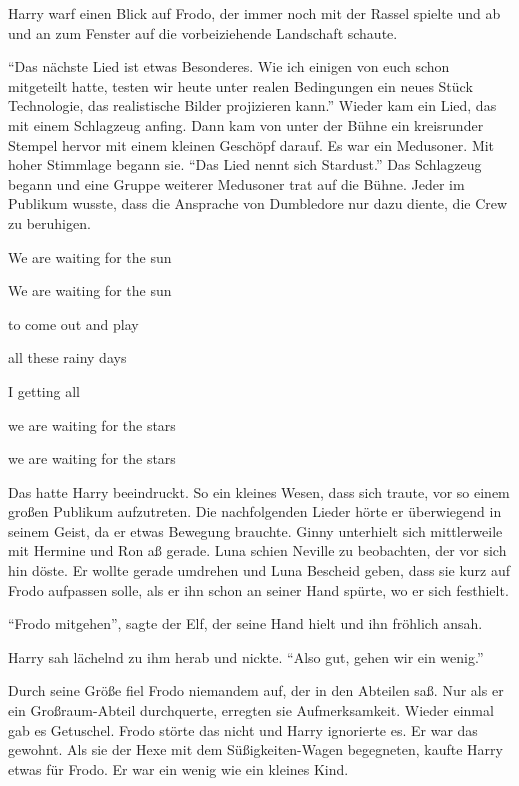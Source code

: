 Harry warf einen Blick auf Frodo, der immer noch mit der Rassel spielte und ab und an zum Fenster auf die vorbeiziehende Landschaft schaute.

\begin{rueckblick}
\enquote{Das nächste Lied ist etwas Besonderes. Wie ich einigen von euch schon mitgeteilt hatte, testen wir heute unter realen Bedingungen ein neues Stück Technologie, das realistische Bilder projizieren kann.} Wieder kam ein Lied, das mit einem Schlagzeug anfing. Dann kam von unter der Bühne ein kreisrunder Stempel hervor mit einem kleinen Geschöpf darauf. Es war ein Medusoner. Mit hoher Stimmlage begann sie. \enquote{Das Lied nennt sich Stardust.} Das Schlagzeug begann und eine Gruppe weiterer Medusoner trat auf die Bühne. Jeder im Publikum wusste, dass die Ansprache von Dumbledore nur dazu diente, die Crew zu beruhigen.

\begin{lied}
We are waiting for the sun

We are waiting for the sun

to come out and play

all these rainy days

I getting all

we are waiting for the stars

we are waiting for the stars\abs
\end{lied}
\end{rueckblick}

Das hatte Harry beeindruckt. So ein kleines Wesen, dass sich traute, vor so einem großen Publikum aufzutreten. Die nachfolgenden Lieder hörte er überwiegend in seinem Geist, da er etwas Bewegung brauchte. Ginny unterhielt sich mittlerweile mit Hermine und Ron aß gerade. Luna schien Neville zu beobachten, der vor sich hin döste. Er wollte gerade umdrehen und Luna Bescheid geben, dass sie kurz auf Frodo aufpassen solle, als er ihn schon an seiner Hand spürte, wo er sich festhielt.

\enquote{Frodo mitgehen}, sagte der Elf, der seine Hand hielt und ihn fröhlich ansah.

Harry sah lächelnd zu ihm herab und nickte. \enquote{Also gut, gehen wir ein wenig.}

Durch seine Größe fiel Frodo niemandem auf, der in den Abteilen saß. Nur als er ein Großraum-Abteil durchquerte, erregten sie Aufmerksamkeit. Wieder einmal gab es Getuschel. Frodo störte das nicht und Harry ignorierte es. Er war das gewohnt. Als sie der Hexe mit dem Süßigkeiten-Wagen begegneten, kaufte Harry etwas für Frodo. Er war ein wenig wie ein kleines Kind.

